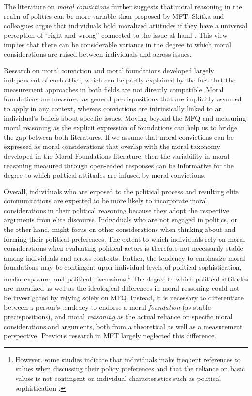\documentclass[12pt]{article}
\begin{document}
The literature on \textit{moral convictions} further suggests that moral reasoning in the realm of politics can be more variable than proposed by MFT. Skitka and colleagues argue that individuals hold moralized attitudes if they have a universal perception of ``right and wrong'' connected to the issue at hand \citep{skitka2005moral,mullen2006exploring,skitka2010psychology}. This view implies that there can be considerable variance in the degree to which moral considerations are raised between individuals and across issues.

Research on moral conviction and moral foundations developed largely independent of each other, which can be partly explained by the fact that the measurement approaches in both fields are not directly compatible. Moral foundations are measured as general predispositions that are implicitly assumed to apply in any context, whereas convictions are intrinsically linked to an individual's beliefs about specific issues. Moving beyond the MFQ and measuring moral reasoning as the explicit expression of foundations can help us to bridge the gap between both literatures. If we assume that moral convictions can be expressed as moral considerations that overlap with the moral taxonomy developed in the Moral Foundations literature, then the variability in moral reasoning measured through open-ended responses can be informative for the degree to which political attitudes are infused by moral convictions.

Overall, individuals who are exposed to the political process and resulting elite communications are expected to be more likely to incorporate moral considerations in their political reasoning because they adopt the respective arguments from elite discourse. Individuals who are not engaged in politics, on the other hand, might focus on other considerations when thinking about and forming their political preferences. The extent to which individuals rely on moral considerations when evaluating political actors is therefore not necessarily stable among individuals and across contexts. Rather, the tendency to emphasize moral foundations may be contingent upon individual levels of political sophistication, media exposure, and political discussions.\footnote{However, some studies indicate that individuals make frequent references to values when discussing their policy preferences \citep{feldman1992political} and that the reliance on basic values is not contingent on individual characteristics such as political sophistication \citep[e.g.][]{goren2001core,goren2004political,marietta2007values}.} The degree to which political attitudes are moralized as well as the ideological differences in moral reasoning could not be investigated by relying solely on MFQ. Instead, it is necessary to differentiate between a person's tendency to endorse a moral \textit{foundation} (as stable predispositions), and moral \textit{reasoning} as the actual reliance on specific moral considerations and arguments, both from a theoretical as well as a measurement perspective. Previous research in MFT largely neglected this difference.
\end{document}
